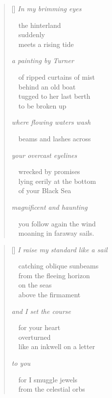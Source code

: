 \documentclass[14pt]{extbook}
\newcommand*{\centeredornament}{\centerline{\pgfornament[width=6cm]{88}}}
\begin{document}
\newpage

\vspace*{-15mm}
\centeredornament
\vspace*{-7mm}


\settowidth{\versewidth}{\ \ you follow again the wind}

\begin{verse}[\versewidth]
  \emph{In my brimming eyes}

  \ \ the hinterland \\
  \ \ suddenly \\
  \ \ meets a rising tide

  \emph{a painting by Turner}

  \ \ of ripped curtains of mist \\
  \ \ behind an old boat \\
  \ \ tugged to her last berth \\
  \ \ to be broken up

  \emph{where flowing waters wash}

  \ \ beams and lashes across

  \emph{your overcast eyelines}

  \ \ wrecked by promises \\
  \ \ lying eerily at the bottom \\
  \ \ of your Black Sea

  \emph{magnificent and haunting}

  \ \ you follow again the wind \\
  \ \ moaning in faraway sails.
\end{verse}


\newpage

\vspace*{-15mm}
\centeredornament
\vspace*{-7mm}



\begin{verse}[\versewidth]
  \emph{I raise my standard like a sail}

  \ \ catching oblique sunbeams \\
  \ \ from the fleeing horizon \\
  \ \ on the seas \\
  \ \ above the firmament

  \emph{and I set the course}

  \ \ for your heart \\
  \ \ overturned \\
  \ \ like an inkwell on a letter

  \emph{to you}

  \ \ for I smuggle jewels \\
  \ \ from the celestial orbs
\end{verse}
\end{document}
